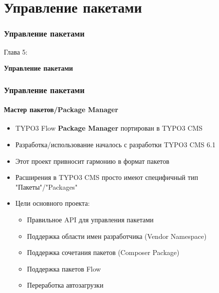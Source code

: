 %

\section{Управление пакетами}
\begin{frame}[fragile]
	\frametitle{Управление пакетами}

	\begin{center}\huge{Глава 5:}\end{center}
	\begin{center}\huge{\color{typo3darkgrey}\textbf{Управление пакетами}}\end{center}

\end{frame}


\begin{frame}[fragile]
	\frametitle{Управление пакетами}
	\framesubtitle{Мастер пакетов/Package Manager}

	\begin{itemize}
		\item TYPO3 Flow \textbf{Package Manager} портирован в TYPO3 CMS
		\item Разработка/использование началось с разработки TYPO3 CMS 6.1
		\item Этот проект привносит гармонию в формат пакетов
		\item Расширения в TYPO3 CMS просто имеют специфичный тип "Пакеты"/"Packages"
		\item Цели основного проекта:

			\begin{itemize}
				\item Правильное API для управления пакетами
				\item Поддержка области имен разработчика (Vendor Namespace)
				\item Поддержка сочетания пакетов (Composer Package)
				\item Поддержка пакетов Flow
				\item Переработка автозагрузки
			\end{itemize}

	\end{itemize}

\end{frame}


